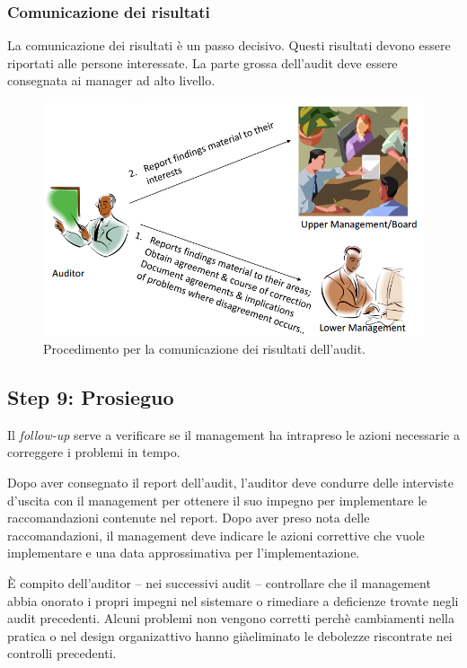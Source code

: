 \subsubsection{Comunicazione dei risultati}

La comunicazione dei risultati è un passo decisivo. Questi risultati devono
essere riportati alle persone interessate.
La parte grossa dell'audit deve essere consegnata ai manager ad alto
livello.

\begin{figure}[h!]
        \begin{center}
                \includegraphics[scale=0.4]{res/img/communication_audit.png}
        \end{center}
        \caption{Procedimento per la comunicazione dei risultati dell'audit.}
\end{figure}

\subsection{Step 9: Prosieguo}


Il \textit{follow-up} serve a verificare se il management ha intrapreso le azioni
necessarie a correggere i problemi in tempo.

Dopo aver consegnato il report dell'audit, l'auditor deve condurre
delle interviste d'uscita con il management per ottenere il suo
impegno per implementare le raccomandazioni contenute nel report.
Dopo aver preso nota delle raccomandazioni, il management deve
indicare le azioni correttive che vuole implementare e una data
approssimativa per l'implementazione.

È compito dell'auditor -- nei successivi audit --
controllare che il management abbia onorato
i propri impegni nel sistemare o rimediare a deficienze trovate negli
audit precedenti.
Alcuni problemi non vengono corretti perchè cambiamenti nella pratica o
nel design organizattivo hanno giàeliminato le debolezze riscontrate nei
controlli precedenti.

